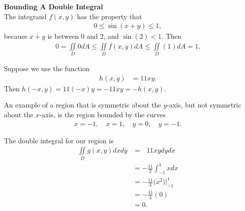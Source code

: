 \item %
\textbf{Bounding A Double Integral} \\
The integrand $f(x,y)$ has the property that 
\begin{align*}
  0 \le \sin(x+y) \le 1,
\end{align*}
because $x+y$ is between 0 and 2, and $\sin(2) < 1$. Then 
\begin{align*}
  0 = \iint\limits_D 0 dA  \le  \iint\limits_D f(x,y) dA \le  \iint\limits_D (1) dA = 1.
\end{align*}
\item %
\BEN
\item 
Suppose we use the function
\begin{align*}
 h(x,y) & = 11xy.
\end{align*}
Then $h(-x,y) = 11(-x)y = -11xy = -h(x,y)$. 
\item An example of a region that is symmetric about the $y$-axis, but not symmetric about the $x$-axis, is the region bounded by the curves
\begin{align*}
  x = -1,  \quad x = 1, \quad y = 0, \quad y = - 1.
\end{align*}
\item The double integral for our region is
\begin{align*}
  \iint\limits_D g(x,y) dxdy 
  &=  \mathop{\int_{-1}^1 \! \int_{-1}^0} 11xy dydx\\
  &=  -\frac{11}{2} \int_{-1}^1 x dx\\
  &=  -\frac{11}{4} \Big(x^2 \Big)\Big|_{-1}^{1} \\
  &=  -\frac{11}{4} (0)\\
  &= 0.
\end{align*}
\EEN
\EEN %
%

